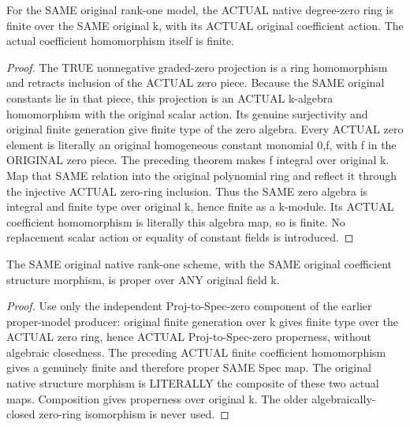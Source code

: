 \begin{theorem}
\label{thm:seven-native-degree-zero-finite-arbitrary-field}
\leanok
For the SAME original rank-one model, the ACTUAL native degree-zero
ring is finite over the SAME original k, with its ACTUAL original
coefficient action. The actual coefficient homomorphism itself is finite.
\end{theorem}
\begin{proof}
The TRUE nonnegative graded-zero projection is a ring homomorphism and
retracts inclusion of the ACTUAL zero piece. Because the SAME original
constants lie in that piece, this projection is an ACTUAL k-algebra
homomorphism with the original scalar action. Its genuine surjectivity
and original finite generation give finite type of the zero algebra.
Every ACTUAL zero element is literally an original homogeneous constant
monomial 0,f, with f in the ORIGINAL zero piece. The preceding theorem
makes f integral over original k. Map that SAME relation into the
original polynomial ring and reflect it through the injective ACTUAL
zero-ring inclusion. Thus the SAME zero algebra is integral and finite
type over original k, hence finite as a k-module. Its ACTUAL coefficient
homomorphism is literally this algebra map, so is finite. No replacement
scalar action or equality of constant fields is introduced.
\end{proof}

\begin{theorem}
\label{thm:seven-native-structure-proper-arbitrary-field}
\leanok
The SAME original native rank-one scheme, with the SAME original
coefficient structure morphism, is proper over ANY original field k.
\end{theorem}
\begin{proof}
Use only the independent Proj-to-Spec-zero component of the earlier
proper-model producer: original finite generation over k gives finite
type over the ACTUAL zero ring, hence ACTUAL Proj-to-Spec-zero properness,
without algebraic closedness. The preceding ACTUAL finite coefficient
homomorphism gives a genuinely finite and therefore proper SAME Spec
map. The original native structure morphism is LITERALLY the composite
of these two actual maps. Composition gives properness over original k.
The older algebraically-closed zero-ring isomorphism is never used.
\end{proof}

